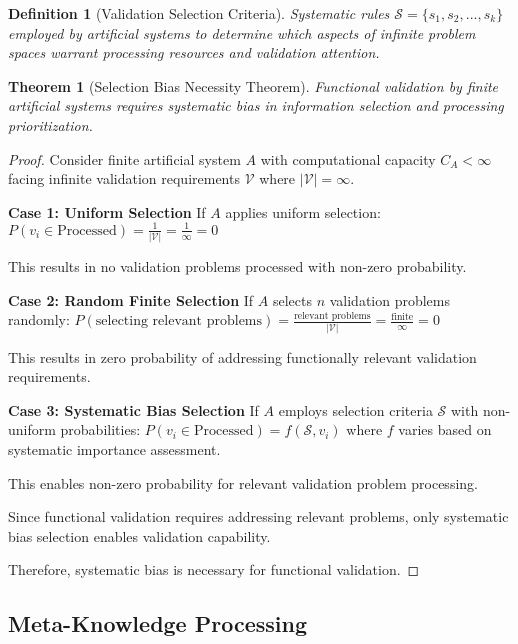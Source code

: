 \documentclass[12pt,a4paper]{article}
\newtheorem{theorem}{Theorem}
\newtheorem{definition}{Definition}
\begin{document}
\begin{definition}[Validation Selection Criteria]
Systematic rules $\mathcal{S} = \{s_1, s_2, ..., s_k\}$ employed by artificial systems to determine which aspects of infinite problem spaces warrant processing resources and validation attention.
\end{definition}

\begin{theorem}[Selection Bias Necessity Theorem]
Functional validation by finite artificial systems requires systematic bias in information selection and processing prioritization.
\end{theorem}

\begin{proof}
Consider finite artificial system $A$ with computational capacity $C_A < \infty$ facing infinite validation requirements $\mathcal{V}$ where $|\mathcal{V}| = \infty$.

\textbf{Case 1: Uniform Selection}
If $A$ applies uniform selection: $P(v_i \in \text{Processed}) = \frac{1}{|\mathcal{V}|} = \frac{1}{\infty} = 0$

This results in no validation problems processed with non-zero probability.

\textbf{Case 2: Random Finite Selection}
If $A$ selects $n$ validation problems randomly: $P(\text{selecting relevant problems}) = \frac{\text{relevant problems}}{|\mathcal{V}|} = \frac{\text{finite}}{\infty} = 0$

This results in zero probability of addressing functionally relevant validation requirements.

\textbf{Case 3: Systematic Bias Selection}
If $A$ employs selection criteria $\mathcal{S}$ with non-uniform probabilities: $P(v_i \in \text{Processed}) = f(\mathcal{S}, v_i)$ where $f$ varies based on systematic importance assessment.

This enables non-zero probability for relevant validation problem processing.

Since functional validation requires addressing relevant problems, only systematic bias selection enables validation capability.

Therefore, systematic bias is necessary for functional validation.
\end{proof}

\subsection{Meta-Knowledge Processing}
\end{document}
